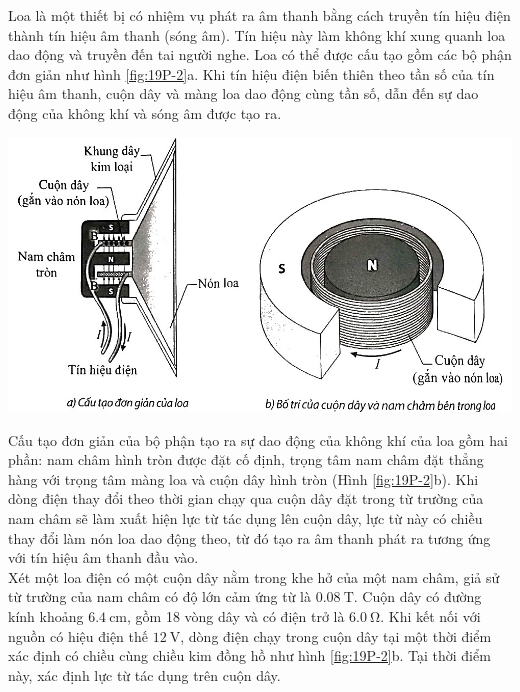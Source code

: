 \begin{ex}
	Loa là một thiết bị có nhiệm vụ phát ra âm thanh bằng cách truyền tín hiệu điện thành tín hiệu âm thanh (sóng âm). Tín hiệu này làm không khí xung quanh loa dao động và truyền đến tai người nghe. Loa có thể được cấu tạo gồm các bộ phận đơn giản như hình \ref{fig:19P-2}a. Khi tín hiệu điện biến thiên theo tần số của tín hiệu âm thanh, cuộn dây và màng loa dao động cùng tần số, dẫn đến sự dao động của không khí và sóng âm được tạo ra.
	\begin{center}
		\includegraphics[width=0.65\linewidth]{figs/VN12-Y24-PH-SYL-019P-2}
		\label{fig:19P-2}
	\end{center}
	Cấu tạo đơn giản của bộ phận tạo ra sự dao động của không khí của loa gồm hai phần: nam châm hình tròn được đặt cố định, trọng tâm nam châm đặt thẳng hàng với trọng tâm màng loa và cuộn dây hình tròn (Hình \ref{fig:19P-2}b). Khi dòng điện thay đổi theo thời gian chạy qua cuộn dây đặt trong từ trường của nam châm sẽ làm xuất hiện lực từ tác dụng lên cuộn dây, lực từ này có chiều thay đổi làm nón loa dao động theo, từ đó tạo ra âm thanh phát ra tương ứng với tín hiệu âm thanh đầu vào.\\
	Xét một loa điện có một cuộn dây nằm trong khe hở của một nam châm, giả sử từ trường của nam châm có độ lớn cảm ứng từ là $\SI{0.08}{\tesla}$. Cuộn dây có đường kính khoảng $\SI{6.4}{\centi\meter}$, gồm 18 vòng dây và có điện trở là $\SI{6.0}{\ohm}$. Khi kết nối với nguồn có hiệu điện thế $\SI{12}{\volt}$, dòng điện chạy trong cuộn dây tại một thời điểm xác định có chiều cùng chiều kim đồng hồ như hình \ref{fig:19P-2}b. Tại thời điểm này, xác định lực từ tác dụng trên cuộn dây.
\end{ex}
